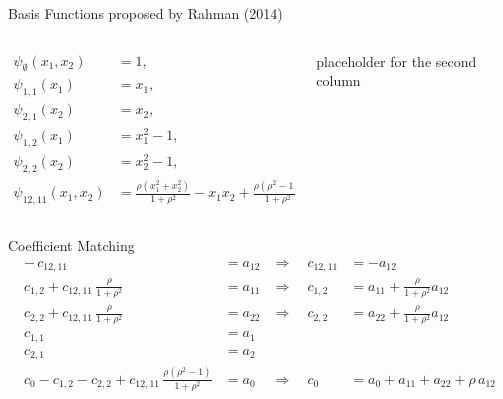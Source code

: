 \begin{frame}{Basis Functions proposed by Rahman (2014)\cite{rahman2014}}
  \begin{columns}
    \begin{column}{0.48\textwidth}
      \begin{align*}
    \psi_{\emptyset}(x_1,x_2) &= 1, \\[0.5em]
\psi_{1,1}(x_1) &= x_1, \\[0.5em]
\psi_{2,1}(x_2) &= x_2, \\[0.5em]
\psi_{1,2}(x_1) &= x_1^2 - 1, \\[0.5em]
\psi_{2,2}(x_2) &= x_2^2 - 1, \\[0.5em]
\psi_{12,11}(x_1,x_2) &= \frac{\rho (x_1^2 + x_2^2)}{1 + \rho^2} 
                         - x_1 x_2 
                         + \frac{\rho(\rho^2 - 1)}{1 + \rho^2},
\end{align*}
  \end{column}
  \begin{column}{0.48\textwidth}
    placeholder for the second column
\end{column}
\end{columns}
\end{frame}

\begin{frame}{Coefficient Matching}
      \begin{align*}
-\,c_{12, 11} &= a_{12} &\Rightarrow\quad c_{12, 11} &= -a_{12} \\[0.5em]
c_{1,2} + c_{12, 11}\,\tfrac{\rho}{1+\rho^2} &= a_{11} 
&\Rightarrow\quad c_{1,2} &= a_{11} + \tfrac{\rho}{1+\rho^2}a_{12} \\[0.5em]
c_{2,2} + c_{12, 11}\,\tfrac{\rho}{1+\rho^2} &= a_{22} 
&\Rightarrow\quad c_{2,2} &= a_{22} + \tfrac{\rho}{1+\rho^2}a_{12} \\[0.5em]
c_{1,1} &= a_1 \\[0.5em]
c_{2,1} &= a_2 \\[0.5em]
c_0 - c_{1,2} - c_{2,2} + c_{12, 11}\,\tfrac{\rho(\rho^2 - 1)}{1+\rho^2} &= a_0 
&\Rightarrow\quad 
c_0 &= a_0 + a_{11} + a_{22} + \rho\,a_{12}
\end{align*}
\end{frame}


